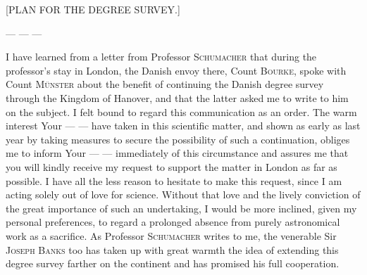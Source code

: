 \par\bigskip
{}%
\begin{center}\large [PLAN FOR THE DEGREE SURVEY.]\end{center}
\par
— — —

I have learned from a letter from Professor \textsc{Schumacher} that during the professor’s stay in London, the Danish envoy there, Count \textsc{Bourke}, spoke with Count \textsc{Münster} about the benefit of continuing the Danish degree survey through the Kingdom of Hanover, and that the latter asked me to write to him on the subject. I felt bound to regard this communication as an order. The warm interest Your — — have taken in this scientific matter, and shown as early as last year by taking measures to secure the possibility of such a continuation, obliges me to inform Your — — immediately of this circumstance and assures me that you will kindly receive my request to support the matter in London as far as possible. I have all the less reason to hesitate to make this request, since I am acting solely out of love for science. Without that love and the lively conviction of the great importance of such an undertaking, I would be more inclined, given my personal preferences, to regard a prolonged absence from purely astronomical work as a sacrifice. As Professor \textsc{Schumacher} writes to me, the venerable Sir \textsc{Joseph Banks} too has taken up with great warmth the idea of extending this degree survey farther on the continent and has promised his full cooperation.

